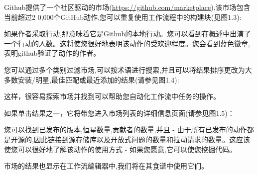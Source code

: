 Github提供了一个社区驱动的市场(\url{https://github.com/marketplace}),该市场包含当前超过2 0,000个GitHub动作,您可以重复使用工作流程中的构建块(见图1.3):


如果作者采取行动,那意味着它是Github的本地行动。您可以看到在概述中出演了一个行动的人数。这将使您很好地表明该动作的受欢迎程度。您会看到蓝色徽章,表明github验证了动作的作者。

您可以通过多个类别过滤市场,可以按术语进行搜索,并且可以将结果排序更改为大多数安装/明星,最佳匹配或最近添加的结果(请参见图1.4):


这样，很容易探索市场并找到可以帮助您自动化工作流中任务的操作。

如果单击结果之一，它将带您进入市场列表的详细信息页面(请参见图1.5)：


您可以找到已发布的版本,恒星数量,贡献者的数量,并且 - 由于所有已发布的动作都是开源的,因此链接到源存储库以及开放式问题的数量和拉动请求的数量。这应该使您可以很好地了解该动作的使用方式 - 如果您愿意,它可以使您挖掘代码。

市场的结果也显示在工作流编辑器中,我们将在其食谱中使用它们。














